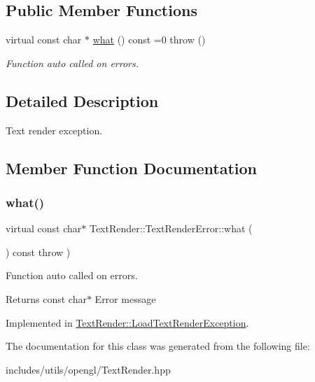 \subsection*{Public Member Functions}
\begin{DoxyCompactItemize}
\item 
virtual const char $\ast$ \hyperlink{class_text_render_1_1_text_render_error_abb3d61a36ca4e1dbc0e4b4412a06cb68}{what} () const =0  throw ()
\begin{DoxyCompactList}\small\item\em Function auto called on errors. \end{DoxyCompactList}\end{DoxyCompactItemize}


\subsection{Detailed Description}
Text render exception. 

\subsection{Member Function Documentation}
\mbox{\label{class_text_render_1_1_text_render_error_abb3d61a36ca4e1dbc0e4b4412a06cb68}} 
\subsubsection{\texorpdfstring{what()}{what()}}
{\footnotesize\ttfamily virtual const char$\ast$ Text\+Render\+::\+Text\+Render\+Error\+::what (\begin{DoxyParamCaption}{ }\end{DoxyParamCaption}) const throw  ) \hspace{0.3cm}{\ttfamily [pure virtual]}}



Function auto called on errors. 

\begin{DoxyReturn}{Returns}
const char$\ast$ Error message 
\end{DoxyReturn}


Implemented in \hyperlink{class_text_render_1_1_load_text_render_exception_a487e3cf1f6316e658b47e70cf4f39ee1}{Text\+Render\+::\+Load\+Text\+Render\+Exception}.



The documentation for this class was generated from the following file\+:\begin{DoxyCompactItemize}
\item 
includes/utils/opengl/Text\+Render.\+hpp\end{DoxyCompactItemize}
